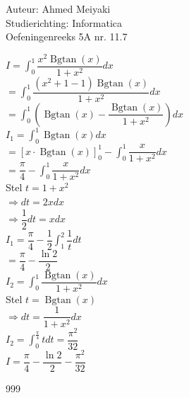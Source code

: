 \documentclass[a4paper]{article}
\begin{document}
  
\noindent \large Auteur: Ahmed Meiyaki \\
\noindent \large Studierichting: Informatica\\
\noindent \large Oefeningenreeks 5A nr. 11.7\\

\medskip

\newcommand{\Bgtan}{\operatorname{Bgtan}}

\normalsize

$I = \displaystyle\int_{0}^{1} \dfrac{x^2 \Bgtan(x)}{1 + x^2} dx $\\

$= \displaystyle\int_{0}^{1} \dfrac{\left(x^2 + 1 - 1\right) \Bgtan(x)}{1 + x^2} dx $\\

$= \displaystyle\int_{0}^{1} \left(\Bgtan(x) - \dfrac{\Bgtan(x)}{1 + x^2}\right) dx $\\

$I_1 = \displaystyle\int_{0}^{1} \Bgtan(x) dx $\\

$=  \left[x\cdot\Bgtan(x)\right]_{0}^{1} - \displaystyle\int_{0}^{1} \dfrac{x}{1 + x^2}dx $\\

$= \dfrac{\pi}{4} - \displaystyle\int_{0}^{1} \dfrac{x}{1 + x^2}dx $\\

Stel $t = 1 + x^2 $\\

$\Rightarrow dt = 2xdx $\\

$\Rightarrow \dfrac{1}{2}dt = xdx $\\

$I_1 = \dfrac{\pi}{4} - \dfrac{1}{2} \displaystyle\int_{1}^{2} \dfrac{1}{t} dt $\\

$= \dfrac{\pi}{4} - \dfrac{\ln2}{2} $\\

$I_2 = \displaystyle\int_{0}^{1}\dfrac{\Bgtan(x)}{1 + x^2} dx $\\

Stel $t = \Bgtan(x) $\\

$\Rightarrow dt = \dfrac{1}{1+x^2} dx$\\

$I_2 = \displaystyle\int_{0}^{\tfrac{\pi}{4}}tdt = \dfrac{\pi^2}{32} $\\

$I = \dfrac{\pi}{4} - \dfrac{\ln2}{2} - \dfrac{\pi^2}{32} $\\




\begin{thebibliography}{999}
\end{thebibliography}
\end{document}
